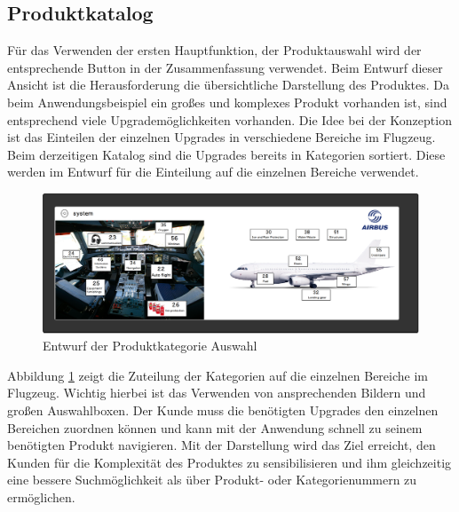 \subsection{Produktkatalog}
Für das Verwenden der ersten Hauptfunktion, der Produktauswahl wird der entsprechende Button in der Zusammenfassung verwendet. Beim Entwurf dieser Ansicht ist die Herausforderung die übersichtliche Darstellung des Produktes. Da beim Anwendungsbeispiel ein großes und komplexes Produkt vorhanden ist, sind entsprechend viele Upgrademöglichkeiten vorhanden. Die Idee bei der Konzeption ist das Einteilen der einzelnen Upgrades in verschiedene Bereiche im Flugzeug. Beim derzeitigen Katalog sind die Upgrades bereits in Kategorien sortiert. Diese werden im Entwurf für die Einteilung auf die einzelnen Bereiche verwendet. \par

\begin{figure}[H]
\centering
\includegraphics[width=\hsize]{images/catalogue_entwurf}
\caption{Entwurf der Produktkategorie Auswahl}
\label{catalogueSketch}
\end{figure}
Abbildung \ref{catalogueSketch} zeigt die Zuteilung der Kategorien auf die einzelnen Bereiche im Flugzeug. Wichtig hierbei ist das Verwenden von ansprechenden Bildern und großen Auswahlboxen. Der Kunde muss die benötigten Upgrades den einzelnen Bereichen zuordnen können und kann mit der Anwendung schnell zu seinem benötigten Produkt navigieren. Mit der Darstellung wird das Ziel erreicht, den Kunden für die Komplexität des Produktes zu sensibilisieren und ihm gleichzeitig eine bessere Suchmöglichkeit als über Produkt- oder Kategorienummern zu ermöglichen. \par 

